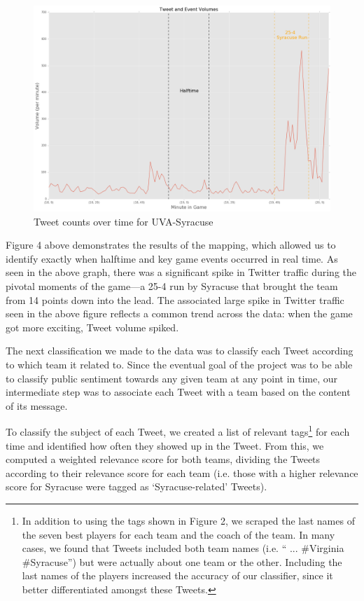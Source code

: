 \documentclass[12pt]{article}
\begin{document}
\begin{doublespacing}
\begin{figure} [H]
	\centering
	\includegraphics[scale = 0.4] {Images/Total_TweetVolume.png} 
	\caption{Tweet counts over time for UVA-Syracuse}
\end{figure}

Figure 4 above demonstrates the results of the mapping, which allowed us to identify exactly when halftime and key game events occurred in real time. As seen in the above graph, there was a significant spike in Twitter traffic during the pivotal moments of the game---a 25-4 run by Syracuse that brought the team from 14 points down into the lead. The associated large spike in Twitter traffic seen in the above figure reflects a common trend across the data: when the game got more exciting, Tweet volume spiked. 

The next classification we made to the data was to classify each Tweet according to which team it related to. Since the eventual goal of the project was to be able to classify public sentiment towards any given team at any point in time, our intermediate step was to associate each Tweet with a team based on the content of its message. 

To classify the subject of each Tweet, we created a list of relevant tags\footnote{In addition to using the tags shown in Figure 2, we scraped the last names of the seven best players for each team and the coach of the team. In many cases, we found that Tweets included both team names (i.e. `` ... \#Virginia \#Syracuse'') but were actually about one team or the other. Including the last names of the players increased the accuracy of our classifier, since it better differentiated amongst these Tweets.} for each time and identified how often they showed up in the Tweet. From this, we computed a weighted relevance score for both teams, dividing the Tweets according to their relevance score for each team (i.e. those with a higher relevance score for Syracuse were tagged as `Syracuse-related' Tweets).  


\end{doublespacing}
\end{document}
